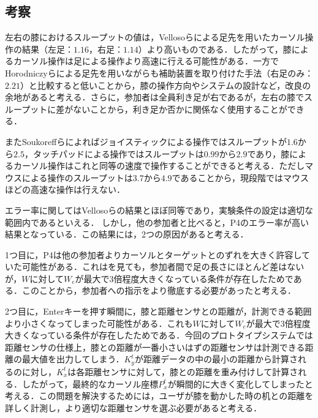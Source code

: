 \documentclass[submit, techrep]{ipsj}
\begin{document}
\subsection{考察}
左右の膝におけるスループットの値は，Vellosoら\cite{velloso:hal-01599657}による足先を用いたカーソル操作の結果（左足：$1.16$，右足：$1.14$）より高いものである．したがって，膝によるカーソル操作は足による操作より高速に行える可能性がある．一方でHorodniczyら\cite{Horodniczy:2017:FHE:3025453.3025625}による足先を用いながらも補助装置を取り付けた手法（右足のみ：$2.21$）と比較すると低いことから，膝の操作方向やシステムの設計など，改良の余地があると考える．さらに，参加者は全員利き足が右であるが，左右の膝でスループットに差がないことから，利き足か否かに関係なく使用することができる．\par
またSoukoreffらによれば\cite{Soukoreff:2004:TSP:1056153.1056155}ジョイスティックによる操作ではスループットが$1.6$から$2.5$，タッチパッドによる操作ではスループットは$0.99$から$2.9$であり，膝によるカーソル操作はこれと同等の速度で操作することができると考える．ただしマウスによる操作のスループットは$3.7$から$4.9$であることから，現段階ではマウスほどの高速な操作は行えない．\par
エラー率に関してはVellosoら\cite{velloso:hal-01599657}の結果とほぼ同等であり，実験条件の設定は適切な範囲内であるといえる．
しかし，他の参加者と比べると，P4のエラー率が高い結果となっている．この結果には，2つの原因があると考える．\par
1つ目に，P4は他の参加者よりカーソルとターゲットとのずれを大きく許容していた可能性がある．これはを見ても，参加者間で足の長さにほとんど差はないが，$W$に対して$W_e$が最大で3倍程度大きくなっている条件が存在したためである．このことから，参加者への指示をより徹底する必要があったと考える．\par
2つ目に，Enterキーを押す瞬間に，膝と距離センサとの距離が，計測できる範囲より小さくなってしまった可能性がある．これも$W$に対して$W_e$が最大で3倍程度大きくなっている条件が存在したためである．今回のプロトタイプシステムでは距離センサの仕様上，膝との距離が一番小さいはずの距離センサは計測できる距離の最大値を出力してしまう．$K^t_y$が距離データの中の最小の距離から計算されるのに対し，$K^t_x$は各距離センサに対して，膝との距離を重み付けして計算される．したがって，最終的なカーソル座標$P^t_x$が瞬間的に大きく変化してしまったと考える．この問題を解決するためには，ユーザが膝を動かした時の机との距離を詳しく計測し，より適切な距離センサを選ぶ必要があると考える．
\end{document}
